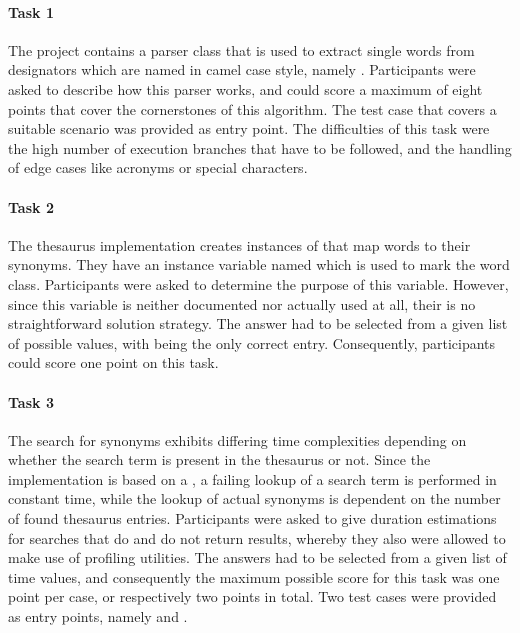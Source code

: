 \paragraph{Task 1} The project contains a parser class that is used to extract single words from designators which are named in camel case style, namely .
Participants were asked to describe how this parser works, and could score a maximum of eight points that cover the cornerstones of this algorithm.
The test case  that covers a suitable scenario was provided as entry point.
The difficulties of this task were the high number of execution branches that have to be followed, and the handling of edge cases like acronyms or special characters.

\paragraph{Task 2} The thesaurus implementation creates instances of  that map words to their synonyms.
They have an instance variable named  which is used to mark the word class.
Participants were asked to determine the purpose of this variable.
However, since this variable is neither documented nor actually used at all, their is no straightforward solution strategy.
The answer had to be selected from a given list of possible values, with  being the only correct entry.
Consequently, participants could score one point on this task.

\paragraph{Task 3} The search for synonyms exhibits differing time complexities depending on whether the search term is present in the thesaurus or not.
Since the implementation is based on a , a failing lookup of a search term is performed in constant time, while the lookup of actual synonyms is dependent on the number of found thesaurus entries.
Participants were asked to give duration estimations for searches that do and do not return results, whereby they also were allowed to make use of profiling utilities.
The answers had to be selected from a given list of time values, and consequently the maximum possible score for this task was one point per case, or respectively two points in total.
Two test cases were provided as entry points, namely  and .

